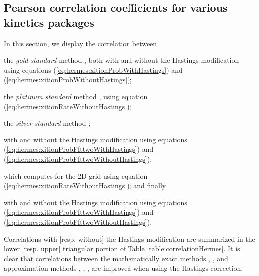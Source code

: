 \subsection{Pearson correlation coefficients for various kinetics packages}
\label{subsec:hermes:corr}

In this section, we display the correlation between
\begin{inparaenum}[\em 1\upshape)]
\item the {\em gold standard} method \rnamfpt, both with and without the Hastings
modification using equations (\ref{eq:hermes:xitionProbWithHastings}) and
(\ref{eq:hermes:xitionProbWithoutHastings});
\item the {\em platinum standard} method \rnaeq, using equation
(\ref{eq:hermes:xitionRateWithoutHastings});
\item the {\em silver standard} method \kinfold;
\item \fftmfpt with and without the Hastings modification using equations
(\ref{eq:hermes:xitionProbFfttwoWithHastings}) and
(\ref{eq:hermes:xitionProbFfttwoWithoutHastings});
\item \ffteq which computes \eqt for the 2D-grid using equation
(\ref{eq:hermes:xitionRateWithoutHastings}); and finally
\item \rnatwofold with and without the Hastings modification using equations
(\ref{eq:hermes:xitionProbFfttwoWithHastings}) and
(\ref{eq:hermes:xitionProbFfttwoWithoutHastings}).
\end{inparaenum}
Correlations
with [resp. without] the Hastings modification are summarized in the
lower [resp. upper] triangular portion of
Table \ref{table:correlationHermes}. It is clear that correlations between
the mathematically exact methods \rnamfpt, \rnaeq, and
approximation methods \kinfold, \fftmfpt, \ffteq, \rnatwofold are
improved when using the Hastings correction.

